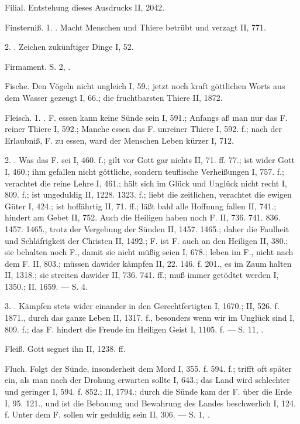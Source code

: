 Filial. Entstehung dieses Ausdrucks II, 2042.

Finsterniß. 1. . Macht Menschen und Thiere betrübt und verzagt II, 771.

2. . Zeichen zukünftiger Dinge I, 52.

Firmament. S.  2, .

Fische. Den Vögeln nicht ungleich I, 59.; jetzt noch kraft göttlichen Worts aus dem Wasser gezeugt I, 66.; die fruchtbarsten Thiere II, 1872.

Fleisch. 1. . F. essen kann keine Sünde sein I, 591.; Anfangs aß man nur das F. reiner Thiere I, 592.; Manche essen das F. unreiner Thiere I, 592. f.;
nach der Erlaubniß, F. zu essen, ward der Menschen Leben kürzer I, 712.

2. . Was das F. sei I, 460. f.; gilt vor Gott gar nichts II, 71. ff. 77.; ist wider Gott I, 460.; ihm gefallen nicht göttliche, sondern teuflische Verheißungen I, 757. f.; verachtet die reine Lehre I, 461.; hält sich im Glück und Unglück nicht recht I, 809. f.; ist ungeduldig II, 1228. 1323. f.; liebt die zeitlichen, verachtet die ewigen Güter I, 424.; ist hoffährtig II, 71. ff.; läßt bald alle Hoffnung fallen II, 741.; hindert am Gebet II, 752. Auch die Heiligen haben noch F. II, 736. 741. 836. 1457. 1465., trotz der Vergebung der Sünden II, 1457. 1465.; daher die Faulheit und Schläfrigkeit der Christen II, 1492.; F. ist F. auch an den Heiligen II, 380.; sie behalten noch F., damit sie nicht müßig seien I, 678.; leben im F., nicht nach dem F. II, 803.; müssen dawider kämpfen II, 22. 146. f. 201., es im Zaum halten II, 1318.; sie streiten dawider II, 736. 741. ff.; muß immer getödtet werden I, 1350.; II, 1659. — S.  4.

3. . Kämpfen stets wider einander in den Gerechtfertigten I, 1670.; II, 526. f. 1871., durch das ganze Leben II, 1317. f., besonders wenn wir im Unglück sind I, 809. f.; das F. hindert die Freude im Heiligen Geist I, 1105. f. — S.  11, .

Fleiß. Gott segnet ihn II, 1238. ff.

Fluch. Folgt der Sünde, insonderheit dem Mord I, 355. f. 594. f.; trifft oft später ein, als man nach der Drohung erwarten sollte I, 643.; das Land wird schlechter und geringer I, 594. f. 852.; II, 1794.; durch die Sünde kam der F. über die Erde I, 95. 121., und ist die Bebauung und Bewahrung des Landes beschwerlich I, 124. f. Unter dem F. sollen wir geduldig sein II, 306. — S.  1, .

